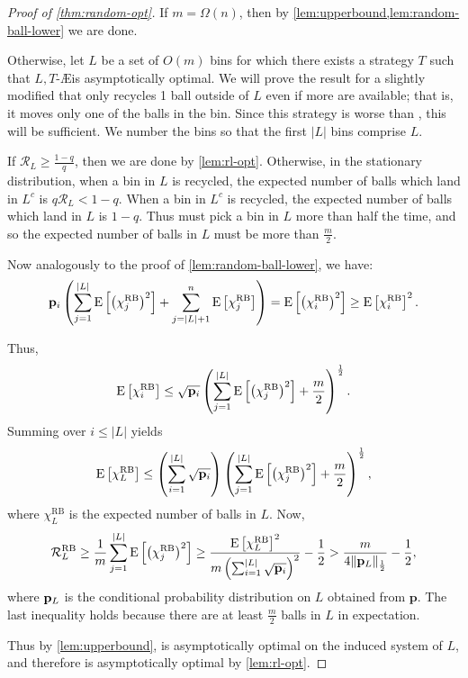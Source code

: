 \begin{proof}[Proof of \cref{thm:random-opt}]
	If $m=\Omega(n)$, then by \cref{lem:upperbound,lem:random-ball-lower} we are done.

	Otherwise, let $L$ be a set of $O(m)$ bins for which there exists a
	strategy $T$ such that $L,T$-\AE is asymptotically optimal. We will prove
	the result for a slightly modified \RB that only recycles 1 ball outside of
	$L$ even if more are available; that is, it moves only one of the balls in
	the bin. Since this strategy is worse than \RB, this will be sufficient. We
	number the bins so that the first $|L|$ bins comprise $L$.
	
	If $\mathcal{R}_L \geq \frac{1-q}{q}$, then we are done by
	\cref{lem:rl-opt}. Otherwise, in the stationary distribution, when a
	bin in $L$ is recycled, the expected number of balls which land in $L^c$ is
	$q\mathcal{R}_L < 1-q$. When a bin in $L^c$ is recycled, the expected
	number of balls which land in $L$ is $1-q$. Thus \RB must pick a bin in $L$
	more than half the time, and so the expected number of balls in $L$ must be
	more than $\frac{m}{2}$.

	Now analogously to the proof of \cref{lem:random-ball-lower}, we have:
        \[ \mathbf{p}_i\left(\sum_{j=1}^{|L|} \mathrm{E}\left[\left(\chi_j^\mathrm{RB}\right)^2\right] + \sum_{j=|L|+1}^n \mathrm{E}\left[\chi_j^\mathrm{RB}\right]\right) = \mathrm{E}\left[\left(\chi_i^\mathrm{RB}\right)^2\right] \geq \mathrm{E}\left[\chi_i^\mathrm{RB}\right]^2.\]

	Thus,
	\[ \mathrm{E}\left[\chi_i^\mathrm{RB}\right] \leq \sqrt{\mathbf{p}_i}\left(\sum_{j=1}^{|L|} \mathrm{E}\left[\left(\chi_j^\mathrm{RB}\right)^2\right] + \frac{m}{2}\right)^{\frac{1}{2}}.\]
	Summing over $i \leq |L|$ yields
	\[ \mathrm{E}\left[\chi_L^\mathrm{RB}\right] \leq \left(\sum_{i=1}^{|L|} \sqrt{\mathbf{p}_i}\right)\left(\sum_{j=1}^{|L|} \mathrm{E}\left[\left(\chi_j^\mathrm{RB}\right)^2\right] + \frac{m}{2}\right)^\frac{1}{2}, \]
	where $\chi_L^\mathrm{RB}$ is the expected number of balls in $L$. Now,
        \[ \mathcal{R}_L^\mathrm{RB} \geq \frac{1}{m}\sum_{j=1}^{|L|} \mathrm{E}\left[\left(\chi_j^\mathrm{RB}\right)^2\right] \geq \frac{\mathrm{E}\left[\chi_L^\mathrm{RB}\right]^2}{m\left(\sum_{i=1}^{|L|} \sqrt{\mathbf{p}_i}\right)^2} - \frac{1}{2} > \frac{m}{4\|\mathbf{p}_L\|_{\frac{1}{2}}} - \frac{1}{2}, \]
	where $\mathbf{p}_L$ is the conditional probability distribution on $L$ obtained
	from $\mathbf{p}$. The last inequality holds because there are at least
	$\frac{m}{2}$ balls in $L$ in expectation.

	Thus by \cref{lem:upperbound}, \RB is asymptotically optimal on the induced
	system of $L$, and therefore \RB is asymptotically optimal by
	\cref{lem:rl-opt}.
\end{proof}
